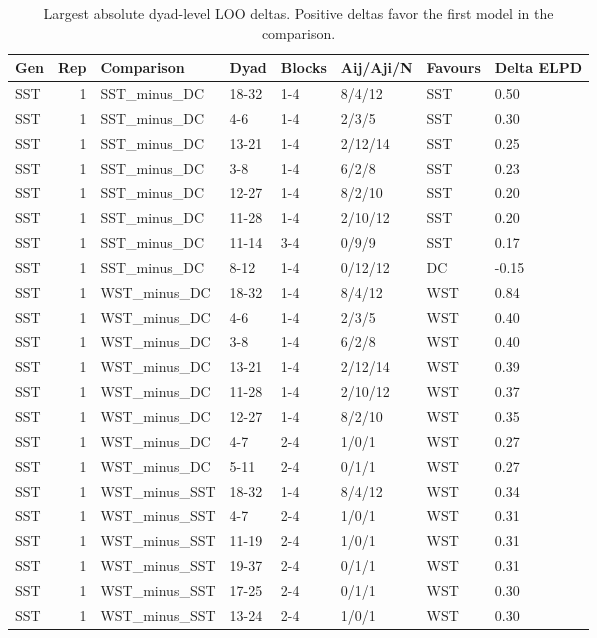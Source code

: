 \begin{table}[!h]
\centering
\caption{Largest absolute dyad-level LOO deltas. Positive deltas favor the first model in the comparison.}
\centering
\begin{tabular}[t]{lrllllll}
\toprule
Gen & Rep & Comparison & Dyad & Blocks & Aij/Aji/N & Favours & Delta ELPD\\
\midrule
SST & 1 & SST_minus_DC & 18-32 & 1-4 & 8/4/12 & SST & 0.50\\
SST & 1 & SST_minus_DC & 4-6 & 1-4 & 2/3/5 & SST & 0.30\\
SST & 1 & SST_minus_DC & 13-21 & 1-4 & 2/12/14 & SST & 0.25\\
SST & 1 & SST_minus_DC & 3-8 & 1-4 & 6/2/8 & SST & 0.23\\
SST & 1 & SST_minus_DC & 12-27 & 1-4 & 8/2/10 & SST & 0.20\\
\addlinespace
SST & 1 & SST_minus_DC & 11-28 & 1-4 & 2/10/12 & SST & 0.20\\
SST & 1 & SST_minus_DC & 11-14 & 3-4 & 0/9/9 & SST & 0.17\\
SST & 1 & SST_minus_DC & 8-12 & 1-4 & 0/12/12 & DC & -0.15\\
SST & 1 & WST_minus_DC & 18-32 & 1-4 & 8/4/12 & WST & 0.84\\
SST & 1 & WST_minus_DC & 4-6 & 1-4 & 2/3/5 & WST & 0.40\\
\addlinespace
SST & 1 & WST_minus_DC & 3-8 & 1-4 & 6/2/8 & WST & 0.40\\
SST & 1 & WST_minus_DC & 13-21 & 1-4 & 2/12/14 & WST & 0.39\\
SST & 1 & WST_minus_DC & 11-28 & 1-4 & 2/10/12 & WST & 0.37\\
SST & 1 & WST_minus_DC & 12-27 & 1-4 & 8/2/10 & WST & 0.35\\
SST & 1 & WST_minus_DC & 4-7 & 2-4 & 1/0/1 & WST & 0.27\\
\addlinespace
SST & 1 & WST_minus_DC & 5-11 & 2-4 & 0/1/1 & WST & 0.27\\
SST & 1 & WST_minus_SST & 18-32 & 1-4 & 8/4/12 & WST & 0.34\\
SST & 1 & WST_minus_SST & 4-7 & 2-4 & 1/0/1 & WST & 0.31\\
SST & 1 & WST_minus_SST & 11-19 & 2-4 & 1/0/1 & WST & 0.31\\
SST & 1 & WST_minus_SST & 19-37 & 2-4 & 0/1/1 & WST & 0.31\\
\addlinespace
SST & 1 & WST_minus_SST & 17-25 & 2-4 & 0/1/1 & WST & 0.30\\
SST & 1 & WST_minus_SST & 13-24 & 2-4 & 1/0/1 & WST & 0.30\\

\end{tabular}
\end{table}
